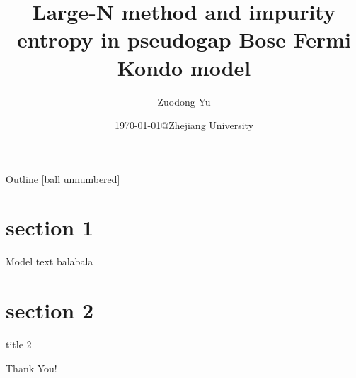\documentclass{beamer}
\title{Large-N method and impurity entropy in pseudogap Bose Fermi Kondo model}
\date{\today @Zhejiang University}
\author{
Zuodong Yu
}
\begin{document}
\maketitle
\begin{frame}{Outline}
  [ball unnumbered]
  \tableofcontents[hideallsubsections]
\end{frame}
\section{section 1}
\begin{frame}{Model}
    text balabala
\end{frame}
\section{section 2}
\begin{frame}{title 2}
\end{frame}
\begin{frame}[standout]
	Thank You!
\end{frame}
\end{document}
